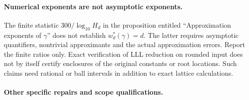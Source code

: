 \documentclass[11pt,a4paper]{article}
\theoremstyle{definition}
\theoremstyle{remark}
\theoremstyle{plain}
\numberwithin{equation}{section}
\begin{document}
\paragraph{Numerical exponents are not asymptotic exponents.}
The finite statistic $300/\log_{10}H_d$ in the proposition entitled ``Approximation exponents of $\gamma$'' does not establish $w_d^*(\gamma)=d$. The latter requires asymptotic quantifiers, nontrivial approximants and the actual approximation errors. Report the finite ratios only. Exact verification of LLL reduction on rounded input does not by itself certify enclosures of the original constants or root locations. Such claims need rational or ball intervals in addition to exact lattice calculations.

\paragraph{Other specific repairs and scope qualifications.}
\end{document}

